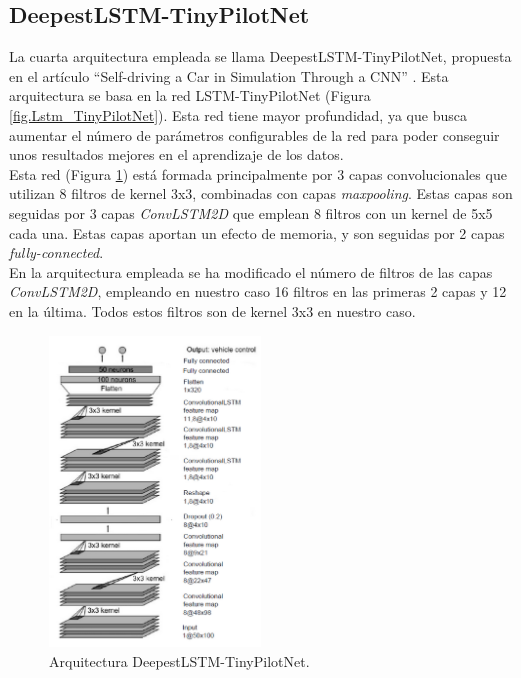 \subsection{DeepestLSTM-TinyPilotNet}

La cuarta arquitectura empleada se llama DeepestLSTM-TinyPilotNet, propuesta en el artículo ``Self-driving a Car in Simulation Through a CNN'' \cite{self-driving}. Esta arquitectura se basa en la red LSTM-TinyPilotNet (Figura \ref{fig.Lstm_TinyPilotNet}). Esta red tiene mayor profundidad, ya que busca aumentar el número de parámetros configurables de la red para poder conseguir unos resultados mejores en el aprendizaje de los datos.\\


Esta red (Figura \ref{fig.DeepestLstm_TinyPilotNet}) está formada principalmente por 3 capas convolucionales que utilizan 8 filtros de kernel 3x3, combinadas con capas \textit{maxpooling}. Estas capas son seguidas por 3 capas \textit{ConvLSTM2D} que emplean 8 filtros con un kernel de 5x5 cada una. Estas capas aportan un efecto de memoria, y son seguidas por 2 capas \textit{fully-connected}.\\

En la arquitectura empleada se ha modificado el número de filtros de las capas \textit{ConvLSTM2D}, empleando en nuestro caso 16 filtros en las primeras 2 capas y 12 en la última. Todos estos filtros son de kernel 3x3 en nuestro caso.\\

\begin{figure}
\begin{center}
	\includegraphics[width=0.5\textwidth]{figures/Regresion/deepestlstm_tinypilotnet.png}
   \caption{Arquitectura DeepestLSTM-TinyPilotNet.}
	\label{fig.DeepestLstm_TinyPilotNet}
\end{center}
\end{figure}



